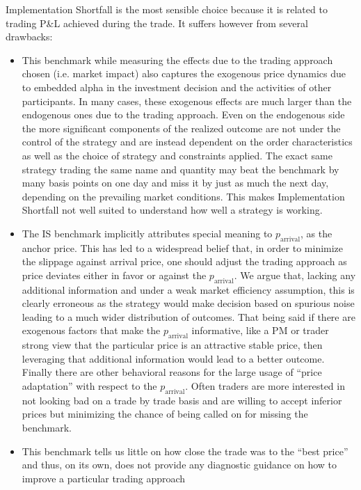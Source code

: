 Implementation Shortfall is the most sensible choice because it is related to trading P\&L achieved during the trade.  It suffers however from several drawbacks:

\begin{itemize}
\item This benchmark while measuring the effects due to the trading approach chosen (i.e. market impact) also captures the exogenous price dynamics due to embedded alpha in the investment decision and the activities of other participants. In many cases, these exogenous effects are much larger than the endogenous ones due to the trading approach. Even on the endogenous side the more significant components of the realized outcome are not under the control of the strategy and are instead dependent on the order characteristics as well as the choice of strategy and constraints applied. The exact same strategy trading the same name and quantity may beat the benchmark by many basis points on one day and miss it by just as much the next day, depending on the prevailing market conditions. This makes Implementation Shortfall not well suited to understand how well a strategy is working.

\item The IS benchmark implicitly attributes special meaning to $p_{\text{arrival}}$, as the anchor price. This has led to a widespread belief that, in order to minimize the slippage against arrival price, one should adjust the trading approach as price deviates either in favor or against the $p_{\text{arrival}}$. We argue that, lacking any additional information and under a weak market efficiency assumption, this is clearly erroneous as the strategy would make decision based on spurious noise leading to a much wider distribution of outcomes. That being said if there are exogenous factors that make the $p_{\text{arrival}}$ informative, like a PM or trader strong view that the particular price is an attractive stable price, then leveraging that additional information would lead to a better outcome. Finally there are other behavioral reasons for the large usage of ``price adaptation'' with respect to the $p_{\text{arrival}}$. Often traders are more interested in not looking bad on a trade by trade basis and are willing to accept inferior prices but minimizing the chance of being called on for missing the benchmark.

\item This benchmark tells us little on how close the trade was to the ``best price'' and thus, on its own, does not provide any diagnostic guidance on how to improve a particular trading approach
\end{itemize}


